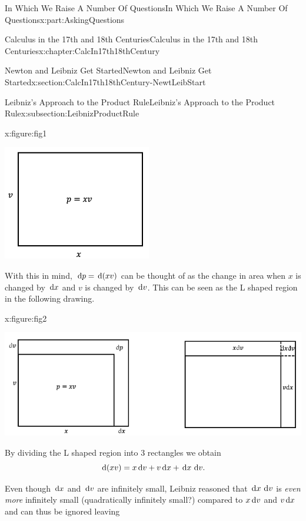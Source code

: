 \documentclass[oneside,10pt,]{book}
\numberwithin{equation}{section}
\newcommand{\dx}[1]{\,{\rm d}#1}
\begin{document}
\begin{partptx}{In Which We Raise A Number Of Questions}{}{In Which We Raise A Number Of Questions}{}{}{x:part:AskingQuestions}
\begin{chapterptx}{Calculus in the 17th and 18th Centuries}{}{Calculus in the 17th and 18th Centuries}{}{}{x:chapter:CalcIn17th18thCentury}
\begin{sectionptx}{Newton and Leibniz Get Started}{}{Newton and Leibniz Get Started}{}{}{x:section:CalcIn17th18thCentury-NewtLeibStart}
\begin{subsectionptx}{Leibniz's Approach to the Product Rule}{}{Leibniz's Approach to the Product Rule}{}{}{x:subsection:LeibnizProductRule}
\begin{figureptx}{}{x:figure:fig1}{}
\begin{image}{0.25}{0.5}{0.25}
\includegraphics[width=\linewidth]{images/fig1.png}
\end{image}%
\tcblower
\end{figureptx}%
With this in mind, \(\dx{ p}=\dx{(xv)}\) can be thought of as the change in area when \(x\) is changed by \(\dx{ x}\) and \(v\) is changed by \(\dx{ v}\).  This can be seen as the L shaped region in the following drawing.%
\begin{figureptx}{}{x:figure:fig2}{}%
\begin{image}{0.05}{0.9}{0.05}%
\includegraphics[width=\linewidth]{images/fig2.png}
\end{image}%
\tcblower
\end{figureptx}%
By dividing the L shaped region into 3 rectangles we obtain%
\begin{equation}
\dx{(xv)}=x\dx{ v}+v\dx{ x}+\dx{ x}\,\dx{ v}\text{.}\label{x:men:eq_LeibnizProductRule}
\end{equation}
%
\par
Even though \(\dx{ x}\) and \(\dx{ v}\) are infinitely small, Leibniz reasoned that \(\dx{ x}\,\dx{ v}\) is \emph{even more} infinitely small (quadratically infinitely small?)  compared to \(x\dx{ v}\) and \(v\dx{ x}\) and can thus be ignored leaving%

\end{subsectionptx}
\end{sectionptx}
\end{chapterptx}
\end{partptx}
\end{document}
